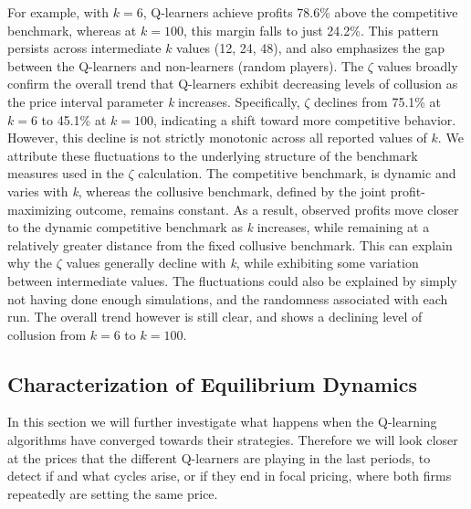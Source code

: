\documentclass{article}
\begin{document}
For example, with $k = 6$, Q-learners achieve profits 78.6\% above the competitive benchmark, whereas at $k = 100$, this margin falls to just 24.2\%. This pattern persists across intermediate $k$ values (12, 24, 48), and also emphasizes the gap between the Q-learners and non-learners (random players).
\newline
The $\zeta$ values broadly confirm the overall trend that Q-learners exhibit decreasing levels of collusion as the price interval parameter \textit{k} increases. Specifically, $\zeta$ declines from 75.1\% at $k= 6$ to 45.1\% at $k=100$, indicating a shift toward more competitive behavior. However, this decline is not strictly monotonic across all reported values of $k$. We attribute these fluctuations to the underlying structure of the benchmark measures used in the $\zeta$ calculation. The competitive benchmark, is dynamic and varies with \textit{k}, whereas the collusive benchmark, defined by the joint profit-maximizing outcome, remains constant. As a result, observed profits move closer to the dynamic competitive benchmark as \textit{k} increases, while remaining at a relatively greater distance from the fixed collusive benchmark.
This can explain why the $\zeta$ values generally decline with \textit{k}, while exhibiting some variation between intermediate values.
The fluctuations could also be explained by simply not having done enough simulations, and the randomness associated with each run. The overall trend however is still clear, and shows a declining level of collusion from $k= 6$ to $k=100$.

\subsection{Characterization of Equilibrium Dynamics}
\label{Convergence Analysis}
In this section we will further investigate what happens when the Q-learning algorithms have converged towards their strategies. Therefore we will look closer at the prices that the different Q-learners are playing in the last periods, to detect if and what cycles arise, or if they end in focal pricing, where both firms repeatedly are setting the same price.
\end{document}
